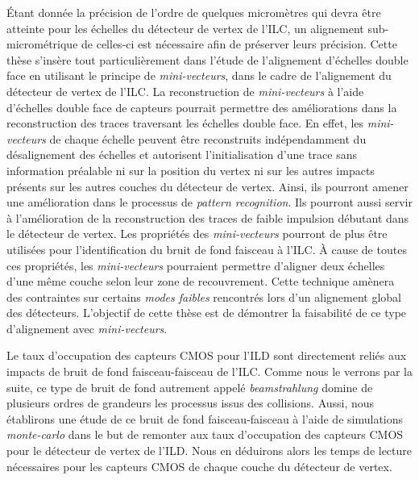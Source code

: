 \documentclass[a4paper,11pt]{report}
\begin{document}
\'Etant donn\'ee la pr\'ecision de l'ordre de quelques microm\`etres qui devra \^etre atteinte pour les \'echelles du d\'etecteur de vertex de l'ILC, un alignement sub-microm\'etrique de celles-ci est n\'ecessaire afin de pr\'eserver leurs pr\'ecision. Cette th\`ese s'ins\`ere tout particuli\`erement dans l'\'etude de l'alignement d'échelles double face en utilisant le principe de \textit{mini-vecteurs}, dans le cadre de l'alignement du d\'etecteur de vertex de l'ILC. La reconstruction de \textit{mini-vecteurs} \`a l'aide d'\'echelles double face de capteurs pourrait permettre des am\'eliorations dans la reconstruction des traces traversant les \'echelles double face. En effet, les \textit{mini-vecteurs} de chaque \'echelle peuvent \^etre reconstruits ind\'ependamment du d\'esalignement des \'echelles et autorisent l'initialisation d'une trace sans information pr\'ealable ni sur la position du vertex ni sur les autres impacts pr\'esents sur les autres couches du d\'etecteur de vertex. Ainsi, ils pourront amener une am\'elioration dans le processus de \textit{pattern recognition}. Ils pourront aussi servir \`a l'am\'elioration de la reconstruction des traces de faible impulsion d\'ebutant dans le d\'etecteur de vertex. Les propri\'et\'es des \textit{mini-vecteurs} pourront de plus \^etre utilis\'ees pour l'identification du bruit de fond faisceau \`a l'ILC. \`A cause de toutes ces propri\'et\'es, les \textit{mini-vecteurs} pourraient permettre d'aligner deux \'echelles d'une même couche selon leur zone de recouvrement. Cette technique am\`enera des contraintes sur certains \textit{modes faibles} rencontr\'es lors d'un alignement global des d\'etecteurs. L'objectif de cette th\`ese est de d\'emontrer la faisabilit\'e de ce type d'alignement avec \textit{mini-vecteurs}.

\medskip

Le taux d'occupation des capteurs CMOS pour l'ILD sont directement reli\'es aux impacts de bruit de fond faisceau-faisceau de l'ILC. Comme nous le verrons par la suite, ce type de bruit de fond autrement appel\'e \textit{beamstrahlung} domine de plusieurs ordres de grandeurs les processus issus des collisions. Aussi, nous \'etablirons une \'etude de ce bruit de fond faisceau-faisceau \`a l'aide de simulations \textit{monte-carlo} dans le but de remonter aux taux d'occupation des capteurs CMOS pour le d\'etecteur de vertex de l'ILD. Nous en d\'eduirons alors les temps de lecture n\'ecessaires pour les capteurs CMOS de chaque couche du d\'etecteur de vertex.

\medskip
\end{document}
